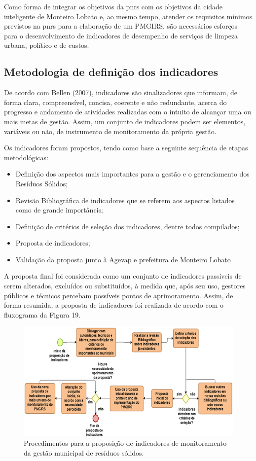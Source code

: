 	Como forma de integrar os objetivos da \gls{pnrs} com os objetivos da cidade inteligente de Monteiro Lobato e, ao mesmo tempo, atender os requisitos mínimos previstos na \gls{pnrs} para a elaboração de um PMGIRS, são necessários esforços para o desenvolvimento de indicadores de desempenho de serviços de limpeza urbana, político e de custos. 
	
	
	\subsection{Metodologia de definição dos indicadores}
	De acordo com Bellen (2007), indicadores são sinalizadores que informam, de forma clara, compreensível, concisa, coerente e não redundante, acerca do progresso e andamento de atividades realizadas com o intuito de alcançar uma ou mais metas de gestão. Assim, um conjunto de indicadores podem ser elementos, variáveis ou não, de instrumento de monitoramento da própria gestão.
	
	Os indicadores foram propostos, tendo como base a seguinte sequência de etapas metodológicas:
	
	\begin{itemize}
		\item Definição dos aspectos mais importantes para a gestão e o
		gerenciamento dos Resíduos Sólidos;
		\item Revisão Bibliográfica de indicadores que se referem aos aspectos
	listados como de grande importância;
		\item Definição de critérios de seleção dos indicadores, dentre todos
	compilados;
		\item Proposta de indicadores;
		\item Validação da proposta junto à Agevap e prefeitura de Monteiro
	Lobato
	\end{itemize} 

	A proposta final foi considerada como um conjunto de indicadores passíveis de serem alterados, excluídos ou substituídos, à medida que, após seu uso, gestores públicos e técnicos percebam possíveis pontos de aprimoramento. Assim, de forma resumida, a proposta de indicadores foi realizada de acordo com o fluxograma da Figura 19.
	
	\begin{figure}
		\centering
		\includegraphics[width=0.75\linewidth]{produtos/prodtres/image096}
		\caption{Procedimentos para a proposição de indicadores de monitoramento da gestão municipal de resíduos sólidos.}
		\label{fig:image096}
	\end{figure}
	
